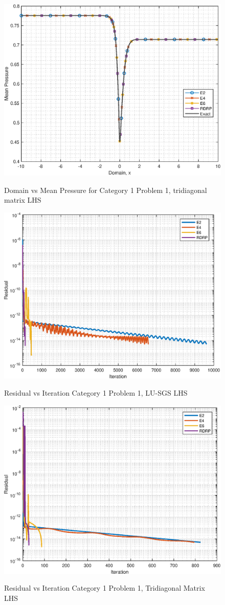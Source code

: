 \documentclass[conf]{new-aiaa}
\begin{document}
\begin{figure}[hbtp!]
	\centering
	{\includegraphics[width=.7\textwidth]{Figures/TriDi_C1P1}}
	\caption{Domain vs Mean Pressure for Category 1 Problem 1, tridiagonal matrix LHS}
	\label{fig:TriDi_C1P1}
\end{figure}


\begin{figure}[hbtp!]
	\centering
	{\includegraphics[width=.7\textwidth]{Figures/C1P1_LUSGS_ROC}}
	\caption{Residual vs Iteration Category 1 Problem 1, LU-SGS LHS}
	\label{fig:LUSGS_C1P1_ROC}
\end{figure}

\begin{figure}[hbtp!]
	\centering
	{\includegraphics[width=.7\textwidth]{Figures/C1P1_TriDi_ROC}}
	\caption{Residual vs Iteration Category 1 Problem 1, Tridiagonal Matrix LHS}
	\label{fig:TriDi_C1P1_ROC}
\end{figure}
\end{document}

